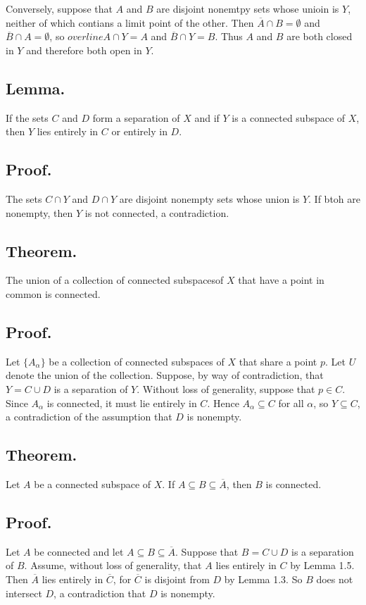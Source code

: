 \documentclass[titlepage]{article}
\begin{document}
Conversely, suppose that $A$ and $B$ are disjoint nonemtpy sets whose unioin is $Y$, neither of which contians a limit point of the other. Then $\overline{A} \cap B = \emptyset$ and $\overline{B} \cap A = \emptyset$, so $overline{A} \cap Y = A$ and $\overline{B} \cap Y = B$. Thus $A$ and $B$ are both closed in $Y$ and therefore both open in $Y$.

\subsection{Lemma.} If the sets $C$ and $D$ form a separation of $X$ and if $Y$ is a connected subspace of $X$, then $Y$ lies entirely in $C$ or entirely in $D$.

\subsection{Proof.} The sets $C \cap Y$ and $D \cap Y$ are disjoint nonempty sets whose union is $Y$. If btoh are nonempty, then $Y$ is not connected, a contradiction.

\subsection{Theorem.} The union of a collection of connected subspacesof $X$ that have a point in common is connected.

\subsection{Proof.} Let $\{A_{\alpha}\}$ be a collection of connected subspaces of $X$ that share a point $p$. Let $U$ denote the union of the collection. Suppose, by way of contradiction, that $Y = C \cup D$ is a separation of $Y$. Without loss of generality, suppose that $p \in C$. Since $A_{\alpha}$ is connected, it must lie entirely in $C$. Hence $A_{\alpha} \subseteq C$ for all $\alpha$, so $Y \subseteq C$, a contradiction of the assumption that $D$ is nonempty.

\subsection{Theorem.} Let $A$ be a connected subspace of $X$. If $A \subseteq B \subseteq \overline{A}$, then $B$ is connected.

\subsection{Proof.} Let $A$ be connected and let $A \subseteq B \subseteq \overline{A}$. Suppose that $B = C \cup D$ is a separation of $B$. Assume, without loss of generality, that $A$ lies entirely in $C$ by Lemma 1.5. Then $\overline{A}$ lies entirely in $\overline{C}$, for $\overline{C}$ is disjoint from $D$ by Lemma 1.3. So $B$ does not intersect $D$, a contradiction that $D$ is nonempty.
\end{document}
